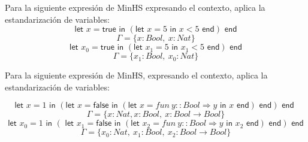 \begin{exercise}    
    Para la siguiente expresión de \textsf{MinHS} expresando el contexto, aplica la estandarización de variables:
    $$ \textsf{let } x = \textsf{true} \textsf{ in } (\textsf{let } x = 5 \textsf{ in } x < 5 \textsf{ end}) \textsf{ end} $$
    $$ \Gamma = \{x:Bool,\ x:Nat\}$$
    $$ \textsf{let } x_0 = \textsf{true} \textsf{ in }  (\textsf{let } x_1 = 5 \textsf{ in } x_1 < 5 \textsf{ end}) \textsf{ end} $$
    $$ \Gamma = \{x_1:Bool,\ x_0:Nat\}$$
\end{exercise}

\begin{exercise}    
    Para la siguiente expresión de \textsf{MinHS}, expresando el contexto, aplica la estandarización de variables:
    
    $$ \textsf{let } x = 1 \textsf{ in } (\textsf{let } x = \textsf{false} \textsf{ in } (\textsf{let } x = fun\ y :: Bool \Rightarrow y  \textsf{ in } x \textsf{ end}) \textsf{ end}) \textsf{ end }$$
    $$ \Gamma = \{ x : Nat, x : Bool,\ x : Bool \to Bool \}$$
    $$ \textsf{let } x_0 = 1 \textsf{ in } (\textsf{ let } x_1 = \textsf{false} \textsf{ in } (\textsf{let } x_2 = fun\ y :: Bool \Rightarrow y \textsf{ in } x_2 \textsf{ end}) \textsf{ end}) \textsf{ end} $$
    $$ \Gamma = \{ x_0 : Nat,\ x_1 : Bool,\ x_2 : Bool \to Bool \}$$
\end{exercise}

